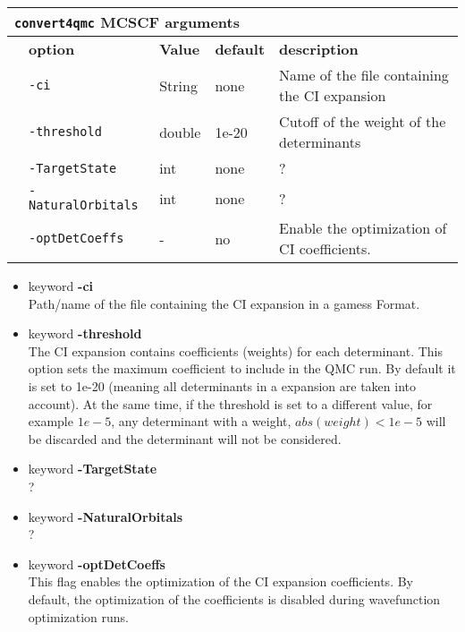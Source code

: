  \begin{table}[h]
 \begin{center}
 \begin{tabularx}{\textwidth}{l l l l l }
 \hline
 \multicolumn{5}{l}{\texttt{convert4qmc} MCSCF arguments} \\
 \hline
    &   \bfseries option      & \bfseries Value & \bfseries default   & \bfseries description \\
    &   \texttt{-ci    } & String     &   none & Name of the file containing the CI expansion  \\
    &   \texttt{-threshold         } &  double    &  1e-20 & Cutoff of the weight of the determinants  \\
    &   \texttt{-TargetState      } & int  &  none & ?  \\
    &   \texttt{-NaturalOrbitals      } &  int      &  none   & ?  \\
    &   \texttt{-optDetCoeffs      } &  -      &   no & Enable the optimization of CI coefficients. \\
    \hline
     \end{tabularx}
 \end{center}
 \end{table}
\begin{itemize}
\item keyword \textbf{-ci}\\
Path/name of the file containing the CI expansion in a gamess Format.
\item keyword \textbf{-threshold}\\
The CI expansion contains coefficients (weights) for each determinant. This option sets the maximum coefficient to include in the QMC run. By default it is set to 1e-20 (meaning all determinants in a expansion are taken into account). At the same time, if the threshold is set to a different value, for example $1e-5$, any determinant with a weight, $abs(weight) < 1e-5$ will be discarded and the determinant will not be considered. 
\item keyword \textbf{-TargetState}\\
?
\item keyword \textbf{-NaturalOrbitals}\\
?
\item keyword \textbf{-optDetCoeffs}\\
This flag enables the optimization of the CI expansion coefficients. By default, the optimization of the coefficients is disabled during wavefunction optimization runs. 
\end{itemize}

